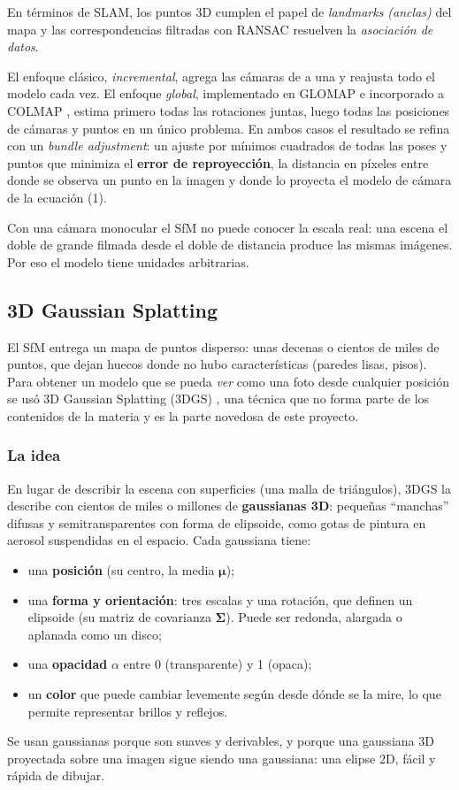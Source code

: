 \documentclass[conference,a4paper]{IEEEtran}
\begin{document}
En términos de SLAM, los puntos 3D cumplen el papel de \textit{landmarks (anclas)} del mapa y las correspondencias filtradas con RANSAC resuelven la \textit{asociación de datos}.

El enfoque clásico, \textit{incremental}, agrega las cámaras de a una y reajusta todo el modelo cada vez. El enfoque \textit{global}, implementado en GLOMAP e incorporado a COLMAP \cite{colmap}, estima primero todas las rotaciones juntas, luego todas las posiciones de cámaras y puntos en un único problema. En ambos casos el resultado se refina con un \textit{bundle adjustment}: un ajuste por mínimos cuadrados de todas las poses y puntos que minimiza el \textbf{error de reproyección}, la distancia en píxeles entre donde se observa un punto en la imagen y donde lo proyecta el modelo de cámara de la ecuación (1).

Con una cámara monocular el SfM no puede conocer la escala real: una escena el doble de grande filmada desde el doble de distancia produce las mismas imágenes. Por eso el modelo tiene unidades arbitrarias.

\subsection{3D Gaussian Splatting}

El SfM entrega un mapa de puntos disperso: unas decenas o cientos de miles de puntos, que dejan huecos donde no hubo características (paredes lisas, pisos). Para obtener un modelo que se pueda \textit{ver} como una foto desde cualquier posición se usó 3D Gaussian Splatting (3DGS) \cite{kerbl2023}, una técnica que no forma parte de los contenidos de la materia y es la parte novedosa de este proyecto.

\subsubsection{La idea}
En lugar de describir la escena con superficies (una malla de triángulos), 3DGS la describe con cientos de miles o millones de \textbf{gaussianas 3D}: pequeñas ``manchas'' difusas y semitransparentes con forma de elipsoide, como gotas de pintura en aerosol suspendidas en el espacio. Cada gaussiana tiene:
\begin{itemize}
\item una \textbf{posición} (su centro, la media $\boldsymbol{\mu}$);
\item una \textbf{forma y orientación}: tres escalas y una rotación, que definen un elipsoide (su matriz de covarianza $\boldsymbol{\Sigma}$). Puede ser redonda, alargada o aplanada como un disco;
\item una \textbf{opacidad} $\alpha$ entre 0 (transparente) y 1 (opaca);
\item un \textbf{color} que puede cambiar levemente según desde dónde se la mire, lo que permite representar brillos y reflejos.
\end{itemize}
Se usan gaussianas porque son suaves y derivables, y porque una gaussiana 3D proyectada sobre una imagen sigue siendo una gaussiana: una elipse 2D, fácil y rápida de dibujar.
\end{document}
